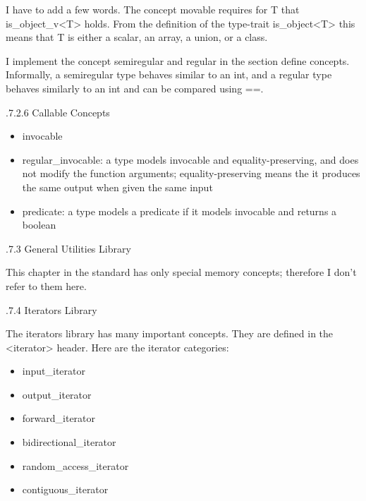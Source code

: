 I have to add a few words. The concept movable requires for T that is\_object\_v<T> holds. From the definition of the type-trait is\_object<T> this means that T is either a scalar, an array, a union, or a class.

I implement the concept semiregular and regular in the section define concepts. Informally, a semiregular type behaves similar to an int, and a regular type behaves similarly to an int and can be compared using ==.

.7.2.6\hspace{0.2cm} Callable Concepts

\begin{itemize}
\item 
invocable

\item 
regular\_invocable: a type models invocable and equality-preserving, and does not modify the function arguments; equality-preserving means the it produces the same output when given the same input

\item 
predicate: a type models a predicate if it models invocable and returns a boolean
\end{itemize}

.7.3\hspace{0.2cm} General Utilities Library

This chapter in the standard has only special memory concepts; therefore I don’t refer to them here.

.7.4\hspace{0.2cm} Iterators Library

The iterators library has many important concepts. They are defined in the <iterator> header. Here are the iterator categories:

\begin{itemize}
\item 
input\_iterator

\item 
output\_iterator

\item 
forward\_iterator

\item 
bidirectional\_iterator

\item 
random\_access\_iterator

\item 
contiguous\_iterator
\end{itemize}

